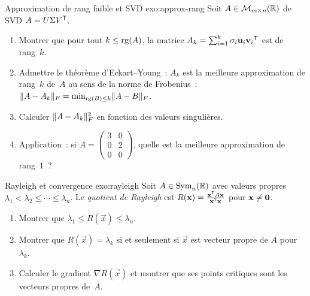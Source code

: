 \begin{exercise}{Approximation de rang faible et SVD \challenging}{exo:approx-rang}
  Soit $A \in \mathcal{M}_{m \times n}({\mathbb{R}})$ de SVD $A = U \Sigma {V}^{\mathsf{T}}$.
  \begin{enumerate}[label=(\alph*)]
    \item Montrer que pour tout $k \leq \operatorname{rg}(A)$, la matrice
      $A_k = \sum_{i=1}^{k} \sigma_i \mathbf{u}_i {\mathbf{v}_i}^{\mathsf{T}}$
      est de rang~$k$.
    \item Admettre le théorème d'Eckart--Young~:
      $A_k$ est la meilleure approximation de rang~$k$ de~$A$ au sens de
      la norme de Frobenius~:
      $\lVert A - A_k\rVert_F = \min_{\operatorname{rg}(B) \leq k} \lVert A - B\rVert_F$.
    \item Calculer $\lVert A - A_k\rVert_F^2$ en fonction des valeurs singulières.
    \item Application~: si $A = \begin{pmatrix} 3 & 0 \\ 0 & 2 \\ 0 & 0
      \end{pmatrix}$, quelle est la meilleure approximation de rang~$1$~?
  \end{enumerate}
\end{exercise}

\begin{exercise}{Rayleigh et convergence \challenging}{exo:rayleigh}
  Soit $A \in \operatorname{Sym}_n({\mathbb{R}})$ avec valeurs propres
  $\lambda_1 < \lambda_2 \leq \cdots \leq \lambda_n$. Le
  \emph{quotient de Rayleigh} est
  $R(\mathbf{x}) = \frac{{\mathbf{x}}^{\mathsf{T}} A \mathbf{x}}{{\mathbf{x}}^{\mathsf{T}} \mathbf{x}}$
  pour $\mathbf{x} \neq \mathbf{0}$.
  \begin{enumerate}[label=(\alph*)]
    \item Montrer que $\lambda_1 \leq R(\vec{x}) \leq \lambda_n$.
    \item Montrer que $R(\vec{x}) = \lambda_k$ si et seulement si $\vec{x}$
      est vecteur propre de $A$ pour $\lambda_k$.
    \item Calculer le gradient $\nabla R(\vec{x})$ et montrer que ses
      points critiques sont les vecteurs propres de~$A$.
  \end{enumerate}
\end{exercise}

